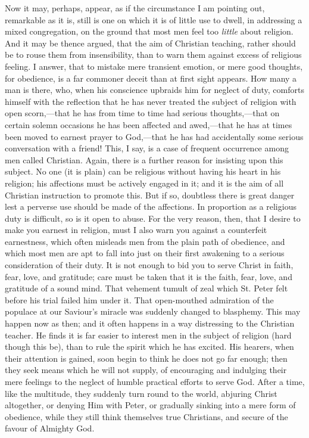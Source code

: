 Now it may, perhaps, appear, as if the circumstance I
am pointing out, remarkable as it is, still is one on
which it is of little use to dwell, in addressing a mixed
congregation, on the ground that most men feel too \emph{little}
about religion. And it may be thence argued, that the aim
of Christian teaching, rather should be to rouse them from
insensibility, than to warn them against excess of
religious feeling. I answer, that to mistake mere
transient emotion, or mere good thoughts, for obedience,
is a far commoner deceit than at first sight appears. How
many a man is there, who, when his conscience upbraids
him for neglect of duty, comforts himself with the
reflection that he has never treated the subject of
religion with open scorn,—that he has from time to
time had serious thoughts,—that on certain solemn
occasions he has been affected and awed,—that he has
at times been moved to earnest prayer to God,—that
he has had accidentally some serious conversation with a
friend! This, I say, is a case of frequent occurrence
among men called Christian. Again, there is a further
reason for insisting upon this subject. No one (it is
plain) can be religious without having his heart in his
religion; his affections must be actively engaged in it;
and it is the aim of all Christian instruction to promote
this. But if so, doubtless there is great danger lest a
perverse use should be made of the affections. In
proportion as a religious duty is difficult, so is it
open to abuse. For the very reason, then, that I desire
to make you earnest in religion, must I also warn you
against a counterfeit earnestness, which often misleads
men from the plain path of obedience, and which most men
are apt to fall into just on their first awakening to a
serious consideration of their duty. It is not enough to
bid you to serve Christ in faith, fear, love, and
gratitude; care must be taken that it is the faith, fear,
love, and gratitude of a sound mind. That vehement tumult
of zeal which St. Peter felt before his trial failed him
under it. That open-mouthed admiration of the populace at
our Saviour's miracle was suddenly changed to blasphemy.
This may happen now as then; and it often happens in a
way distressing to the Christian teacher. He finds it is
far easier to interest men in the subject of religion
(hard though this be), than to rule the spirit which he
has excited. His hearers, when their attention is gained,
soon begin to think he does not go far enough; then they
seek means which he will not supply, of encouraging and
indulging their mere feelings to the neglect of humble
practical efforts to serve God. After a time, like the
multitude, they suddenly turn round to the world,
abjuring Christ altogether, or denying Him with Peter, or
gradually sinking into a mere form of obedience, while
they still think themselves true Christians, and secure
of the favour of Almighty God.

